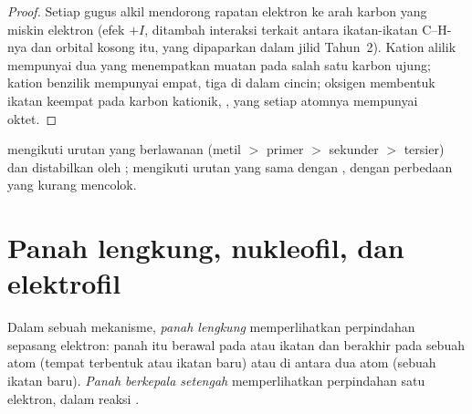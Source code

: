 \begin{proof}
Setiap gugus alkil mendorong rapatan elektron ke arah karbon yang miskin
elektron (efek $+I$, ditambah interaksi terkait antara ikatan-ikatan
C--H-nya dan orbital kosong itu, yang dipaparkan dalam jilid Tahun~2).
Kation alilik mempunyai dua  yang menempatkan muatan
pada salah satu karbon ujung; kation benzilik mempunyai empat, tiga di
dalam cincin;  oksigen membentuk ikatan keempat
pada karbon kationik, , yang setiap atomnya mempunyai oktet.
\end{proof}

 mengikuti urutan yang berlawanan (metil $>$ primer $>$ sekunder
$>$ tersier) dan distabilkan oleh ;  mengikuti
urutan yang sama dengan , dengan perbedaan yang kurang
mencolok.

\section{Panah lengkung, nukleofil, dan elektrofil}

\begin{definition}\label{def:b1:electronic-effects:curly-arrow}
Dalam sebuah mekanisme, \emph{panah lengkung}
memperlihatkan perpindahan sepasang elektron: panah itu berawal pada
 atau ikatan dan berakhir pada sebuah atom
(tempat terbentuk  atau ikatan baru) atau di
antara dua atom (sebuah ikatan baru). \emph{Panah berkepala
setengah} memperlihatkan perpindahan satu
elektron, dalam reaksi .
\end{definition}

